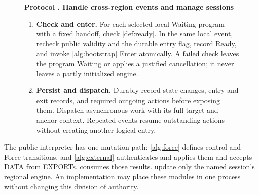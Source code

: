 \documentclass[11pt,a4paper]{article}
\newcommand{\tagg}[1]{\ensuremath{\mathsf{#1}}}
\newcounter{protocol}
\newenvironment{protocol}[3][htbp]{\begin{figure}[#1]\refstepcounter{protocol}\label{#2}
\begin{mdframed}[linewidth=.6pt,skipabove=0pt,skipbelow=0pt,
innertopmargin=7pt,innerbottommargin=7pt]\small
\textbf{Protocol \theprotocol. #3}\par\smallskip}{\end{mdframed}\end{figure}}
\begin{document}
\begin{protocol}[H]{alg:rotation}{Handle cross-region events and manage sessions}
\begin{enumerate}[label=\textbf{\arabic*)},itemsep=3pt]
in the durable $\tagg{Closed}[\beta]$ map. Gate new entry and fresh
actions in every phase. For each known session snapshot of that branch
version, including unentered and archived programs, run the complete
closure relay and idempotent \texttt{RequestClose} of
\cref{sec:retirement}. If the snapshot is not yet known, keep a pending
relay obligation. Any later old-session packet with the needed context
triggers this control response before ordinary processing. Keep signed
routing, historical evidence and publication duties. Apply terminal
receipts to entered source engines under the Completion rule.
\item \textbf{Check and enter.} For each selected local Waiting program
with a fixed handoff, check \cref{def:ready}. In the same local event,
recheck public validity and the durable entry flag, record Ready, and
invoke \cref{alg:bootstrap} Enter atomically. A failed check leaves the
program Waiting or applies a justified cancellation; it never leaves a
partly initialized engine.
\item \textbf{Persist and dispatch.} Durably record state changes, entry
and exit records, and required outgoing actions before exposing them.
Dispatch asynchronous work with its full target and anchor context.
Repeated events resume outstanding actions without creating another
logical entry.
\end{enumerate}
\end{protocol}

The public interpreter has one mutation path: \cref{alg:force} defines
control and Force transitions, and \cref{alg:external} authenticates and
applies them and accepts DATA from EXPORTs.  consumes
those results.  update only the named
session's regional engine. An implementation may place these modules in
one process without changing this division of authority.
\end{document}
